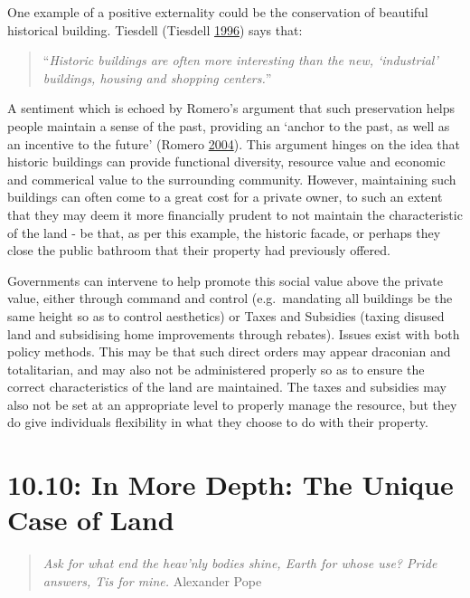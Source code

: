 \documentclass[]{tufte-handout}
\begin{document}
One example of a positive externality could be the conservation of
beautiful historical building. Tiesdell (Tiesdell
\protect\hyperlink{ref-tiesdell1996}{1996}) says that:

\begin{quote}
``\emph{Historic buildings are often more interesting than the new,
`industrial' buildings, housing and shopping centers.}''
\end{quote}

A sentiment which is echoed by Romero's argument that such preservation
helps people maintain a sense of the past, providing an `anchor to the
past, as well as an incentive to the future' (Romero
\protect\hyperlink{ref-romero2004}{2004}). This argument hinges on the
idea that historic buildings can provide functional diversity, resource
value and economic and commerical value to the surrounding community.
However, maintaining such buildings can often come to a great cost for a
private owner, to such an extent that they may deem it more financially
prudent to not maintain the characteristic of the land - be that, as per
this example, the historic facade, or perhaps they close the public
bathroom that their property had previously offered.

Governments can intervene to help promote this social value above the
private value, either through command and control (e.g.~mandating all
buildings be the same height so as to control aesthetics) or Taxes and
Subsidies (taxing disused land and subsidising home improvements through
rebates). Issues exist with both policy methods. This may be that such
direct orders may appear draconian and totalitarian, and may also not be
administered properly so as to ensure the correct characteristics of the
land are maintained. The taxes and subsidies may also not be set at an
appropriate level to properly manage the resource, but they do give
individuals flexibility in what they choose to do with their property.

\hypertarget{in-more-depth-the-unique-case-of-land}{%
\section{10.10: In More Depth: The Unique Case of
Land}\label{in-more-depth-the-unique-case-of-land}}

\begin{quote}
\emph{Ask for what end the heav'nly bodies shine, Earth for whose use?
Pride answers, Tis for mine.} Alexander Pope
\end{quote}
\end{document}
